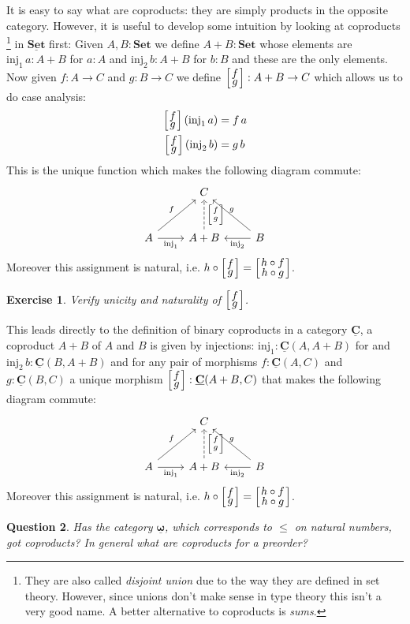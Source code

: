\documentclass{article}
\newcommand{\Set}{\mathbf{Set}}
\newcommand{\cat}[1]{\underline{\mathbf{#1}}}
\newcommand{\homC}[3]{\cat{#1}(#2,#3)}
\newcommand{\inj}{\mathrm{inj}}
\newcommand{\case}[2]{{\setlength{\arraycolsep}{1pt}
   \renewcommand{\arraystretch}{0.6}\left[\begin{array}{c}#1\\#2\end{array}\right]}}
\newtheorem{exercise}{Exercise}
\newtheorem{question}[exercise]{Question}
\begin{document}
It is easy to say what are coproducts: they are simply products in the opposite category. However, it is useful to develop some intuition by looking at coproducts
\footnote{They are also called \emph{disjoint union} due to the way they are defined in set theory. However, since unions don't make sense in type theory this isn't a very good name. A better alternative to coproducts is \emph{sums}.}
 in $\cat{\Set}$ first: Given $A,B : \Set$ we define $A + B : \Set$ whose elements are $\inj_1\,a : A+B$ for $a:A$ and $\inj_2\,b : A+B$ for $b:B$ and these are the only elements. Now given $f : A \to C$ and $g : B \to C$ we define $\case{f}{g} : A + B \to C$ which allows us to do case analysis:
\begin{align*}
\case{f}{g}\,(\inj_1\,a) & = f\,a \\
\case{f}{g}\,(\inj_2\,b) & = g\,b
\end{align*}
This is the unique function which makes the following diagram commute:
\[\begin{tikzcd}[row sep=large]
& C \\
A \arrow[r,"\inj_1" below] \arrow[ur,"f"] & A + B \arrow[u,dashrightarrow,"\case{f}{g}" right] & B \arrow[l,"\inj_2"] \arrow[ul,"g" above]
\end{tikzcd}\]
Moreover this assignment is natural, i.e. $h \circ \case{f}{g} = \case{h\circ f}{h\circ g}$.
\begin{exercise}
  Verify unicity and naturality of $\case{f}{g}$.
\end{exercise}

This leads directly to the definition of binary coproducts in a category $\cat{C}$, a coproduct $A+B$ of $A$ and $B$ is given by injections:
$\inj_1 : \homC{C}{A}{A+B}$ for and $\inj_2\,b : \homC{C}{B}{A+B}$ and for any pair of morphisms $f : \homC{C}{A}{C}$ and 
$g : \homC{C}{B}{C}$ a unique morphism $\case{f}{g} : \homC{C}{A+B}{C}$ that makes the following diagram commute:
\[\begin{tikzcd}[row sep=large]
& C \\
A \arrow[r,"\inj_1" below] \arrow[ur,"f"] & A + B \arrow[u,dashrightarrow,"\case{f}{g}" right] & B \arrow[l,"\inj_2"] \arrow[ul,"g" above]
\end{tikzcd}\]
Moreover this assignment is natural, i.e. $h \circ \case{f}{g} = \case{h\circ f}{h\circ g}$.

\begin{question}
  Has the category $\cat{\omega}$, which corresponds to $\leq$ on natural numbers, got coproducts? In general what are coproducts for a preorder?
\end{question}
\end{document}

